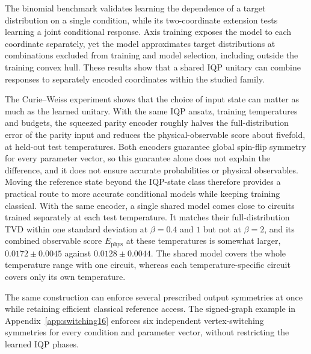 \documentclass[pra,aps,10pt,twocolumn,floatfix,superscriptaddress, notitlepage,longbibliography]{revtex4-2}
\begin{document}
The binomial benchmark validates learning the dependence of a target distribution on a single condition, while its two-coordinate extension tests learning a joint conditional response. Axis training exposes the model to each coordinate separately, yet the model approximates target distributions at combinations excluded from training and model selection, including outside the training convex hull. These results show that a shared IQP unitary can combine responses to separately encoded coordinates within the studied family.

The Curie--Weiss experiment shows that the choice of input state can matter as much as the learned unitary. With the same IQP ansatz, training temperatures and budgets, the squeezed parity encoder roughly halves the full-distribution error of the parity input and reduces the physical-observable score about fivefold, at held-out test temperatures. Both encoders guarantee global spin-flip symmetry for every parameter vector, so this guarantee alone does not explain the difference, and it does not ensure accurate probabilities or physical observables. Moving the reference state beyond the IQP-state class therefore provides a practical route to more accurate conditional models while keeping training classical. With the same encoder, a single shared model comes close to circuits trained separately at each test temperature. It matches their full-distribution TVD within one standard deviation at $\beta=0.4$ and $1$ but not at $\beta=2$, and its combined observable score $E_{\mathrm{phys}}$ at these temperatures is somewhat larger, $0.0172\pm0.0045$ against $0.0128\pm0.0044$. The shared model covers the whole temperature range with one circuit, whereas each temperature-specific circuit covers only its own temperature.

The same construction can enforce several prescribed output symmetries at once while retaining efficient classical reference access. The signed-graph example in Appendix~\ref{app:switching16} enforces six independent vertex-switching symmetries for every condition and parameter vector, without restricting the learned IQP phases.
\end{document}
